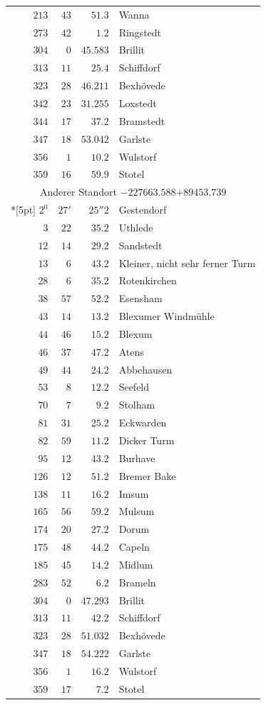 \begin{longtable}{@{}rrrp{.61\linewidth}@{}}
\(213\)&\(43\)&\(51.3\)&\raggedright Wanna\tabularnewline
\(273\)&\(42\)&\(1.2\)&\raggedright Ringstedt\tabularnewline
\(304\)&\(0\)&\(45.583\)&\raggedright Brillit\tabularnewline
\(313\)&\(11\)&\(25.4\)&\raggedright Schiffdorf\tabularnewline
\(323\)&\(28\)&\(46.211\)&\raggedright Bexhövede\tabularnewline
\(342\)&\(23\)&\(31.255\)&\raggedright Loxstedt\tabularnewline
\(344\)&\(17\)&\(37.2\)&\raggedright Bramstedt\tabularnewline
\(347\)&\(18\)&\(53.042\)&\raggedright Garlste\tabularnewline
\(356\)&\(1\)&\(10.2\)&\raggedright Wulstorf\tabularnewline
\(359\)&\(16\)&\(59.9\)&\raggedright Stotel\tabularnewline
\multicolumn{4}{c}{Anderer Standort \(-227663.588\)\qquad\(+89453.739\)}\\*[5pt]
\(2^{0}\)&\(27'\)&\(25''2\)&\raggedright Gestendorf\tabularnewline
\(3\)&\(22\)&\(35.2\)&\raggedright Uthlede\tabularnewline
\(12\)&\(14\)&\(29.2\)&\raggedright Sandstedt\tabularnewline
\(13\)&\(6\)&\(43.2\)&\raggedright Kleiner, nicht sehr ferner Turm\tabularnewline
\(28\)&\(6\)&\(35.2\)&\raggedright Rotenkirchen\tabularnewline
\(38\)&\(57\)&\(52.2\)&\raggedright Esensham\tabularnewline
\(43\)&\(14\)&\(13.2\)&\raggedright Blexumer Windmühle\tabularnewline
\(44\)&\(46\)&\(15.2\)&\raggedright Blexum\tabularnewline
\(46\)&\(37\)&\(47.2\)&\raggedright Atens\tabularnewline
\(49\)&\(44\)&\(24.2\)&\raggedright Abbehausen\tabularnewline
\(53\)&\(8\)&\(12.2\)&\raggedright Seefeld\tabularnewline
\(70\)&\(7\)&\(9.2\)&\raggedright Stolham\tabularnewline
\(81\)&\(31\)&\(25.2\)&\raggedright Eckwarden\tabularnewline
\(82\)&\(59\)&\(11.2\)&\raggedright Dicker Turm\tabularnewline
\(95\)&\(12\)&\(43.2\)&\raggedright Burhave\tabularnewline
\(126\)&\(12\)&\(51.2\)&\raggedright Bremer Bake\tabularnewline
\(138\)&\(11\)&\(16.2\)&\raggedright Imsum\tabularnewline
\(165\)&\(56\)&\(59.2\)&\raggedright Mulsum\tabularnewline
\(174\)&\(20\)&\(27.2\)&\raggedright Dorum\tabularnewline
\(175\)&\(48\)&\(44.2\)&\raggedright Capeln\tabularnewline
\(185\)&\(45\)&\(14.2\)&\raggedright Midlum\tabularnewline
\(283\)&\(52\)&\(6.2\)&\raggedright Brameln\tabularnewline
\(304\)&\(0\)&\(47.293\)&\raggedright Brillit\tabularnewline
\(313\)&\(11\)&\(42.2\)&\raggedright Schiffdorf\tabularnewline
\(323\)&\(28\)&\(51.032\)&\raggedright Bexhövede\tabularnewline
\(347\)&\(18\)&\(54.222\)&\raggedright Garlste\tabularnewline
\(356\)&\(1\)&\(16.2\)&\raggedright Wulstorf\tabularnewline
\(359\)&\(17\)&\(7.2\)&\raggedright Stotel\tabularnewline
\end{longtable}
\endgroup
